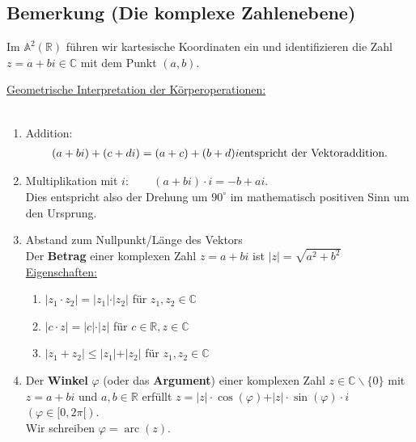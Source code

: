 	
\subsection[Die komplexe Zahlenebene]{Bemerkung (Die komplexe Zahlenebene)}

	Im $\mathbb{A}^2(\mathbb{R})$ führen wir kartesische Koordinaten ein und identifizieren die Zahl
	$z = a+bi\in \mathbb{C}$ mit dem Punkt $(a,b)$.\\ \newline
	
	\underline{Geometrische Interpretation der Körperoperationen:}\\
	\
	\begin{enumerate}
	\item Addition:
	\begin{align*}
	(a+bi)+(c+di)=(a+c)+(b+d)i \textnormal{entspricht der Vektoraddition.}
	\end{align*}
	
	\item Multiplikation mit $i: \qquad (a+bi)\cdot i=-b+ai$.\\ \newline
	Dies entspricht also der Drehung um $90^{\circ}$ im mathematisch positiven Sinn um den Ursprung.

	\item Abstand zum Nullpunkt/Länge des Vektors\\
	Der \textbf{Betrag} einer komplexen Zahl $z=a+bi$ ist $\vert z \vert=\sqrt{a^2+b^2}$\\ \newline
	\underline{Eigenschaften:}
		\begin{enumerate}
		\item $\vert z_1\cdot z_2\vert = \vert z_1\vert\cdot\vert z_2\vert$ für $z_1,z_2\in\mathbb{C}$
		\item $\vert c\cdot z\vert = \vert c\vert\cdot\vert z\vert$ für $c\in\mathbb{R},z\in\mathbb{C}$
		\item $\vert z_1 + z_2\vert \leq \vert z_1\vert + \vert z_2\vert$ für $z_1,z_2\in\mathbb{C}$
		\end{enumerate}
		
	\item Der \textbf{Winkel} $\varphi$ (oder das \textbf{Argument}) einer komplexen Zahl 
	$z\in\mathbb{C}\backslash\{0\}$ mit $z=a+bi$ und $a,b\in\mathbb{R}$ erfüllt 
	$z=\vert z\vert\cdot \cos(\varphi) + \vert z \vert \cdot \sin(\varphi)\cdot i 
	\qquad$ \mbox{$(\varphi\in[0,2\pi[)$}.\\ \newline
	Wir schreiben $\varphi=\operatorname{arc}(z).$
	

\end{enumerate}
